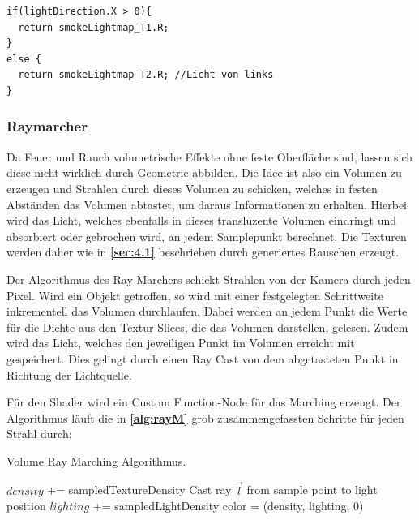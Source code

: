 \vspace{.6cm}
\begin{lstlisting}[language={[Sharp]C}, label={lst:lightMapLogik}, caption={Logik zur Auswahl der richtigen Lightmap am Beispiel der X-Richtung des Lichts.},captionpos=b, frame=single]
if(lightDirection.X > 0){
  return smokeLightmap_T1.R; 
}
else {
  return smokeLightmap_T2.R; //Licht von links
}

\end{lstlisting}


\subsubsection{Raymarcher}

Da Feuer und Rauch volumetrische Effekte ohne feste Oberfläche sind, lassen sich diese nicht wirklich durch Geometrie abbilden. Die Idee ist also ein
Volumen zu erzeugen und Strahlen durch dieses Volumen zu schicken, welches in festen Abständen das Volumen abtastet, um daraus Informationen zu erhalten.
Hierbei wird das Licht, welches ebenfalls in dieses transluzente Volumen eindringt und absorbiert oder gebrochen wird, an jedem Samplepunkt berechnet.
Die Texturen werden daher wie in \textbf{\autoref{sec:4.1}} beschrieben durch generiertes Rauschen erzeugt.

Der Algorithmus des Ray Marchers schickt Strahlen von der Kamera durch jeden Pixel. Wird ein Objekt getroffen, so wird mit einer festgelegten Schrittweite
inkrementell das Volumen durchlaufen. Dabei werden an jedem Punkt die Werte für die Dichte aus den Textur Slices, die das Volumen darstellen, gelesen. Zudem
wird das Licht, welches den jeweiligen Punkt im Volumen erreicht mit gespeichert. Dies gelingt durch einen Ray Cast von dem abgetasteten Punkt in Richtung der Lichtquelle.

Für den Shader wird ein Custom Function-Node für das Marching erzeugt. Der Algorithmus läuft die in \textbf{\autoref{alg:rayM}} grob zusammengefassten Schritte für jeden Strahl durch:


\begin{algorithm}
	\caption{Volume Ray Marching Algorithmus.}\label{alg:rayM}
	\begin{algorithmic}

		\State $density$ += sampledTextureDensity
		\State Cast ray $\vec{l}$ from sample point to light position
		\State $lighting$ += sampledLightDensity
		\EndFor
		\EndFor
		\State color = (density, lighting, 0)
	\end{algorithmic}
\end{algorithm}

